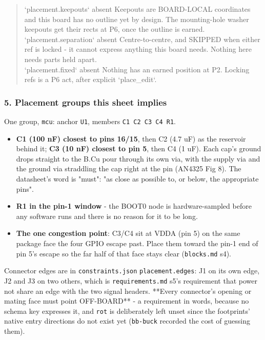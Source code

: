 \documentclass[11pt,a4paper]{article}
\begin{document}
\begin{quote}
\textbar{} `placement.keepouts` \textbar{} absent \textbar{} Keepouts are BOARD-LOCAL coordinates and this board has no outline yet by design. The mounting-hole washer keepouts get their rects at P6, once the outline is earned. \textbar{}\\
\textbar{} `placement.separation` \textbar{} absent \textbar{} Centre-to-centre, and SKIPPED when either ref is locked - it cannot express anything this board needs. Nothing here needs parts held apart. \textbar{}\\
\textbar{} `placement.fixed` \textbar{} absent \textbar{} Nothing has an earned position at P2. Locking refs is a P6 act, after explicit `place\_edit`. \textbar{}
\end{quote}
\subsubsection*{5. Placement groups this sheet implies}
One group, \texttt{mcu}: anchor \texttt{U1}, members \texttt{C1 C2 C3 C4 R1}.

\begin{itemize}
\item \textbf{C1 (100 nF) closest to pins 16/15}, then C2 (4.7 uF) as the reservoir
behind it; \textbf{C3 (10 nF) closest to pin 5}, then C4 (1 uF). Each cap's ground
drops straight to the B.Cu pour through its own via, with the supply via and
the ground via straddling the cap right at the pin (AN4325 Fig 8). The
datasheet's word is "must": "as close as possible to, or below, the
appropriate pins".
\item \textbf{R1 in the pin-1 window} - the BOOT0 node is hardware-sampled before any
software runs and there is no reason for it to be long.
\item \textbf{The one congestion point}: C3/C4 sit at VDDA (pin 5) on the same package
face the four GPIO escape past. Place them toward the pin-1 end of pin 5's
escape so the far half of that face stays clear (\texttt{blocks.md} s4).
\end{itemize}
Connector edges are in \texttt{constraints.json} \texttt{placement.edges}: J1 on its own edge, J2 and J3 on two others, which is \texttt{requirements.md} s5's requirement that power not share an edge with the two signal headers. {*}{*}Every connector's opening or mating face must point OFF-BOARD{*}{*} - a requirement in words, because no schema key expresses it, and \texttt{rot} is deliberately left unset since the footprints' native entry directions do not exist yet (\texttt{bb-buck} recorded the cost of guessing them).
\end{document}

